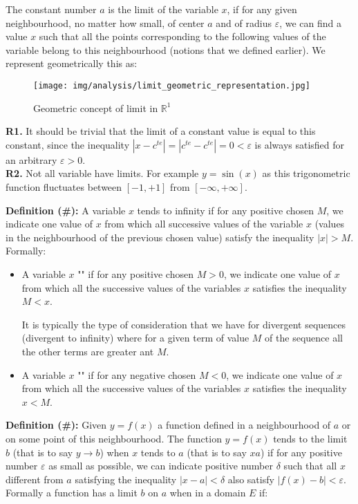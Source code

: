 	The constant number $a$ is the limit of the variable $x$, if for any given neighbourhood, no matter how small, of center $a$ and of radius $\varepsilon$, we can find a value $x$ such that all the points corresponding to the following values of the variable belong to this neighbourhood (notions that we defined earlier). We represent geometrically this as:
	\begin{figure}[H]
		\centering
		\texttt{[image: img/analysis/limit\_geometric\_representation.jpg]}
		\caption{Geometric concept of limit in $\mathbb{R}^1$}
	\end{figure}
	\begin{tcolorbox}[title=Remarks,colframe=black,arc=10pt]
	\textbf{R1.} It should be trivial that the limit of a constant value is equal to this constant, since the inequality $|x-c^{te}|=|c^{te}-c^{te}|=0<\varepsilon $ is always satisfied for an arbitrary $\varepsilon>0$.\\
	
	\textbf{R2.}  Not all variable have limits. For example $y=\sin(x)$ as this trigonometric function fluctuates between $[-1,+1]$ from $[-\infty,+\infty]$.
	\end{tcolorbox}
	
	\textbf{Definition (\#\mydef):} A variable $x$ tends to infinity if for any positive chosen $M$, we indicate one value of $x$ from which all successive values of the variable $x$ (values in the neighbourhood of the previous chosen value) satisfy the inequality $|x|>M$. Formally:
	
	\begin{itemize}
		\item A variable $x$ "" if for any positive chosen $M>0$, we indicate one value of $x$ from which all the successive values of the variables $x$ satisfies the inequality $M<x$.
	
		It is typically the type of consideration that we have for divergent sequences (divergent to infinity) where for a given term of value $M$ of the sequence all the other terms are greater ant $M$.
		
		
		\item A variable $x$ "" if for any negative chosen $M<0$, we indicate one value of $x$ from which all the successive values of the variables $x$ satisfies the inequality $x<M$.
		
	\end{itemize}
	\textbf{Definition (\#\mydef):} Given $y=f(x)$ a function defined in a neighbourhood of $a$ or on some point of this neighbourhood. The function $y=f(x)$ tends to the limit $b$ (that is to say $y\rightarrow b$) when $x$ tends to $a$ (that is to say $x a$) if for any positive number $\varepsilon$ as small as possible, we can indicate  positive number $\delta$ such that all $x$ different from $a$ satisfying the inequality $|x-a|<\delta$ also satisfy $|f(x)-b|<\varepsilon$. Formally a function has a limit $b$ on $a$ when in a domain $E$ if:
	
